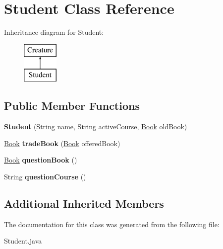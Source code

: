 \hypertarget{class_student}{}\section{Student Class Reference}
\label{class_student}
Inheritance diagram for Student\+:\begin{figure}[H]
\begin{center}
\leavevmode
\includegraphics[height=2.000000cm]{class_student}
\end{center}
\end{figure}
\subsection*{Public Member Functions}
\begin{DoxyCompactItemize}
\item 
\hypertarget{class_student_af836d4d8e20f567a6837a1fe16e79ac7}{}{\bfseries Student} (String name, String active\+Course, \hyperlink{class_book}{Book} old\+Book)\label{class_student_af836d4d8e20f567a6837a1fe16e79ac7}

\item 
\hypertarget{class_student_a9b84dc1d537780b4d225dc0318adc75d}{}\hyperlink{class_book}{Book} {\bfseries trade\+Book} (\hyperlink{class_book}{Book} offered\+Book)\label{class_student_a9b84dc1d537780b4d225dc0318adc75d}

\item 
\hypertarget{class_student_a1417ab7f2dd79ed1608833f80a5e5bfa}{}\hyperlink{class_book}{Book} {\bfseries question\+Book} ()\label{class_student_a1417ab7f2dd79ed1608833f80a5e5bfa}

\item 
\hypertarget{class_student_a37a0ad9f33a5b49247eb8d3301887b73}{}String {\bfseries question\+Course} ()\label{class_student_a37a0ad9f33a5b49247eb8d3301887b73}

\end{DoxyCompactItemize}
\subsection*{Additional Inherited Members}


The documentation for this class was generated from the following file\+:\begin{DoxyCompactItemize}
\item 
Student.\+java\end{DoxyCompactItemize}

